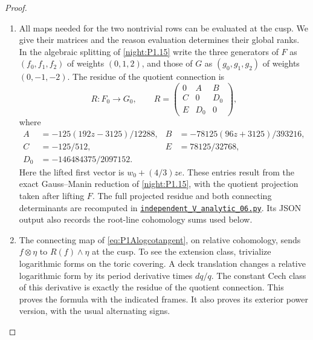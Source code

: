 \begin{proof}
\begin{enumerate}[label={$\langle1\rangle$\arabic*.}]
\item All maps needed for the two nontrivial rows can be evaluated at
the cusp. We give their matrices and the reason evaluation
determines their global ranks. In the algebraic splitting of
\cref{night:P1.15} write the three generators of $F$ as $(f_0,f_1,f_2)$ of
weights $(0,1,2)$, and those of $G$ as $(g_0,g_1,g_2)$ of
weights $(0,-1,-2)$. The residue of the quotient connection is
\[
R:F_0\longrightarrow G_0,\qquad
R=\begin{pmatrix}0&A&B\\C&0&D_0\\E&D_0&0\end{pmatrix},
\]
where
\begin{align*}
A&=-125(192z-3125)/12288,&
B&=-78125(96z+3125)/393216,\\
C&=-125/512,&E&=78125/32768,\\
D_0&=-146484375/2097152.
\end{align*}
Here the lifted first vector is $w_0+(4/3)ze$.
These entries result from the exact Gauss--Manin reduction of
\cref{night:P1.15}, with the quotient projection taken after lifting $F$.
The full projected residue and both connecting determinants are
recomputed in \href{https://github.com/KokunoYumeto/s6-complex-structure-workbench/blob/83d76022bcd442278b760db9ff438afceed6c6ea/pro_returns/S6_SERIES_GRIND_checkpoint_10_20261120T0211Z/code/current_audits/audit_corrections/code/independent_V_analytic_06.py}{\texttt{independent\_V\_analytic\_06.py}}.
Its JSON output also records the root-line cohomology sums used below.

\item The connecting map of \eqref{eq:P1Alogcotangent}, on relative
cohomology, sends $f\otimes\eta$ to $R(f)\wedge\eta$ at the
cusp. To see the extension class, trivialize logarithmic
forms on the toric covering. A deck translation changes a
relative logarithmic form by its period derivative times
$dq/q$. The constant Cech class of this derivative is exactly
the residue of the quotient connection. This proves the
formula with the indicated frames. It also proves its exterior
power version, with the usual alternating signs.


\end{enumerate}
\end{proof}
